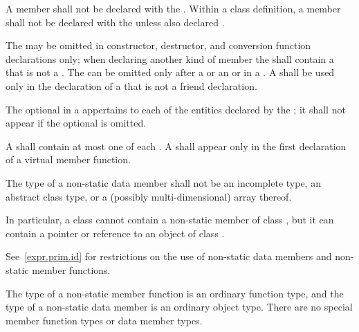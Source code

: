 \pnum
A member shall not be declared with the 
. Within a class definition, a member shall not be declared with the   unless also declared .

\pnum
The  may be omitted in constructor, destructor,
and conversion function declarations only;
when declaring another kind of member the 
shall contain a  that is not a .
The
 can be omitted only after a
 or an  or in a
. A
 shall be used only in the declaration of a
that is not a friend declaration.

\pnum
The optional  in a 
appertains to each of the entities declared by the ;
it shall not appear if the optional  is omitted.

\pnum
A  shall contain at most one of each
.
A 
shall appear only in the first declaration of a virtual member
function.

\pnum
{}%
The type of a non-static data member shall not be an
incomplete type,
an abstract class type,
or a (possibly multi-dimensional) array thereof.
\begin{note}
In particular, a class  cannot contain
a non-static member of class ,
but it can contain a pointer or reference to an object of class .
\end{note}

\pnum
\begin{note}
See~\ref{expr.prim.id} for restrictions on the use of non-static data
members and non-static member functions.
\end{note}

\pnum
\begin{note}
The type of a non-static member function is an ordinary function type,
and the type of a non-static data member is an ordinary object type.
There are no special member function types or data member types.
\end{note}

